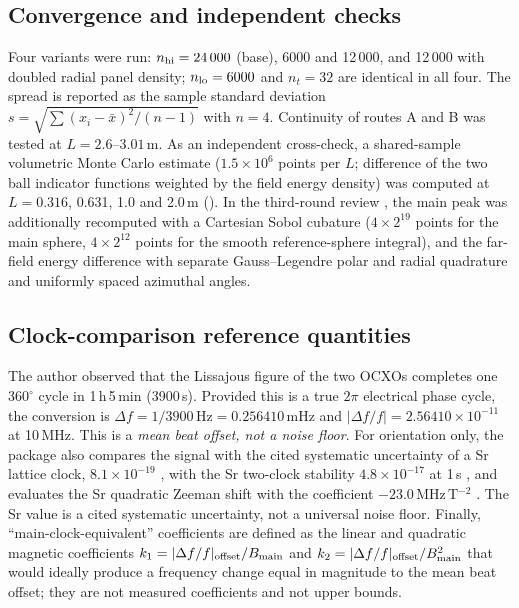 \documentclass[12pt,a4paper]{article}
\begin{document}
\subsection{Convergence and independent checks}\label{sec:conv}
Four variants were run: $n_{\rm hi}=24\,000$ (base), 6000 and 12\,000, and 12\,000 with doubled radial panel
density; $n_{\rm lo}=6000$ and $n_t=32$ are identical in all four. The spread is reported as the sample
standard deviation $s=\sqrt{\sum(x_i-\bar x)^2/(n-1)}$ with $n=4$. Continuity of routes A and B was tested
at $L=2.6$--$3.01$\,m. As an independent cross-check, a shared-sample volumetric Monte Carlo estimate
($1.5\times10^6$ points per $L$; difference of the two ball indicator functions weighted by the field energy
density) was computed at $L=0.316$, 0.631, 1.0 and 2.0\,m ().
In the third-round review \cite{TAL_V20}, the main peak was additionally recomputed with a Cartesian Sobol
cubature \cite{Sobol1967} ($4\times2^{19}$ points for the main sphere, $4\times2^{12}$ points for the smooth
reference-sphere integral), and the far-field energy difference with separate Gauss--Legendre polar and radial
quadrature and uniformly spaced azimuthal angles.

\subsection{Clock-comparison reference quantities}\label{sec:clockref}
The author observed that the Lissajous figure of the two OCXOs completes one $360^\circ$ cycle in 1\,h\,5\,min
(3900\,s). Provided this is a true $2\pi$ electrical phase cycle, the conversion is
$\Delta f=1/3900\,\mathrm{Hz}=0.256410$\,mHz and $|\Delta f/f|=2.56410\times10^{-11}$ at 10\,MHz. This is a
\emph{mean beat offset, not a noise floor}. For orientation only, the package also compares the signal with the
cited systematic uncertainty of a Sr lattice clock, $8.1\times10^{-19}$ \cite{Aeppli2024}, with the Sr
two-clock stability $4.8\times10^{-17}$ at 1\,s \cite{Oelker2019}, and evaluates the Sr quadratic Zeeman shift
with the coefficient $-23.0$\,MHz\,T$^{-2}$ \cite{Lu2020}. The Sr value is a cited systematic uncertainty, not a
universal noise floor. Finally, ``main-clock-equivalent'' coefficients are defined as the linear and quadratic
magnetic coefficients $k_1=|\Delta f/f|_{\rm offset}/B_{\rm main}$ and $k_2=|\Delta f/f|_{\rm offset}/B_{\rm main}^2$ that
would ideally produce a frequency change equal in magnitude to the mean beat offset; they are not measured
coefficients and not upper bounds.
\end{document}

